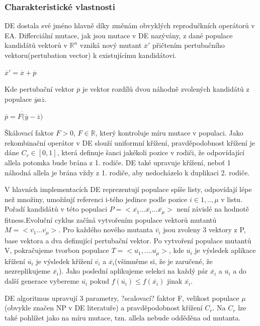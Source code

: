 \subsubsection{Charakteristické vlastnosti}
DE dostala své jméno hlavně díky změnám obvyklých reprodučkních operátorů v EA. Differciální mutace, jak jsou mutace v DE nazývány, z dané populace kandidátů vektorů v $\mathbb{R}^n$ vzniká nový mutant $\overline{x}'$ přičtením pertubačního vektoru(pertubation vector) k existujícímu kandidátovi. \par
$\overline{x}'=\overline{x}+\overline{p}$ \par
Kde pertubační vektor $\overline{p}$ je vektor rozdílů dvou náhodně zvolených kandidátů z populace $\overline{y} a \overline{z}$. \par 
$\overline{p}=F\dot(\overline{y}-\overline{z})$ \par
Škálovací faktor $F>0$, $F \in \mathbb{R}$, který kontroluje míru mutace v populaci. Jako rekombinační operátor v DE slouží uniformní křížení, pravděpodobnost křížení je dáne $C_r \in [0,1]$, která definuje šanci jakékoli pozice v rodiči, že odpovídající allela potomka bude brána z 1. rodiče. DE také upravuje křížení, neboť 1 náhodná allela je brána vždy z 1. rodiče, aby nedocházelo k duplikaci 2. rodiče. \par 
V hlavních implementacích DE reprezentují populace spíše listy, odpovídají lépe než množiny, umožňují referenci i-tého jedince podle pozice $i\in{1,..,\mu}$ v listu. Pořadí kandidátů v této populaci $P=<\overline{x_1}...\overline{x_i}...\overline{x_{\mu}}>$ není závislé na hodnotě fitness.Evoluční cyklus začíná vytvořením populace vektorů mutantů $M=<\overline{v_1}...\overline{v_{\mu}}>$. Pro každého nového mutanta $\overline{v_i}$ jsou zvoleny 3 vektory z P, base vektora a dva definující pertubační vektor. Po vytvoření populace mutantů V, pokračujeme tvorbou populace $T=<\overline{u_1},....\overline{u_{\mu}}>$, kde $\overline{u_i}$ je výsledek aplikace křížení $\overline{u_i}$ je výsledek křížení $\overline{v_i}$ a $\overline{x_i}$(všimněme si, že je zaručené, že nezreplikujeme $\overline{x_i}$). Jako poslední aplikujeme selekci na každý pár $\overline{x_i}$ a $\overline{u_i}$ a do další generace vybereme $\overline{u_i}$ pokud $f(\overline{u_i}) \leq f(\overline{x_i})$ jinak $\overline{x_i}$. \par 
DE algoritmus upravují 3 parametry, ?scalovací? faktor F, velikost populace $\mu$ (obvykle značen NP v DE literatuře) a pravděpodobnost křížení $C_r$. Na $C_r$ lze také pohlížet jako na míru mutace, tzn. allela nebude odděděna od mutanta.\par

